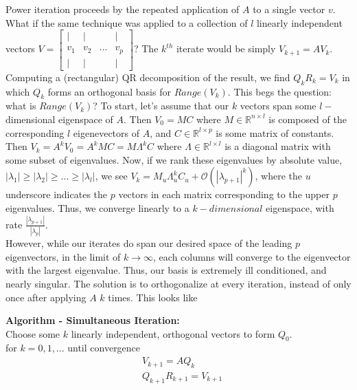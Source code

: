 \documentclass[11pt]{article}
\newcommand{\Rmn}[2]{\mathbb{R}^{#1 \times #2}}
\begin{document}
Power iteration proceeds by the repeated application of $A$ to a single vector $v$. What if the same technique was applied to a collection of $l$ linearly independent vectors $V = \begin{bmatrix} | & | & & | \\ v_1 & v_2 & \hdots & v_p \\ | & | & & | \end{bmatrix}$? The $k^{th}$ iterate would be simply $V_{k+1} = A V_k$. Computing a (rectangular) QR decomposition of the result, we find $Q_k R_k = V_k$ in which $Q_k$ forms an orthogonal basis for $Range(V_k)$. This begs the question: what is $Range(V_k)$? To start, let's assume that our $k$ vectors span some $l-$dimensional eigenspace of $A$. Then $V_0 = MC$ where $M \in \Rmn{n}{l}$ is composed of the corresponding $l$ eigenevectors of $A$, and $C \in \Rmn{l}{p}$ is some matrix of constants. Then $V_k = A^k V_0 = A^k MC = M \Lambda^k C$ where $\Lambda \in \Rmn{l}{l}$ is a diagonal matrix with some subset of eigenvalues. Now, if we rank these eigenvalues by absolute value, $|\lambda_1| \geq | \lambda_2 | \geq ... \geq | \lambda_l |$, we see $V_k = M_u \Lambda_u^k C_u + \mathcal{O}(|\lambda_{p+1} |^k)$, where the $u$ underscore indicates the $p$ vectors in each matrix corresponding to the upper $p$ eigenvalues. Thus, we converge linearly to a $k-dimensional$ eigenspace, with rate $\frac{|\lambda_{p+1}|}{|\lambda_{p}|}$. \\

However, while our iterates do span our desired space of the leading $p$ eigenvectors, in the limit of $k \rightarrow \infty$, each columns will converge to the eigenvector with the largest eigenvalue. Thus, our basis is extremely ill conditioned, and nearly singular. The solution is to orthogonalize at every iteration, instead of only once after applying $A$ $k$ times. This looks like

\begin{framed}
\textbf{Algorithm - Simultaneous Iteration:} \\
\hspace{5mm} Choose some $k$ linearly independent, orthogonal vectors to form $Q_0$. \\
\hspace{5mm} for $k=0,1,...$ until convergence \\
\begin{align*}
  &V_{k+1} = A Q_k \\
  &Q_{k+1}R_{k+1} = V_{k+1}
\end{align*}
\end{framed}
\end{document}
